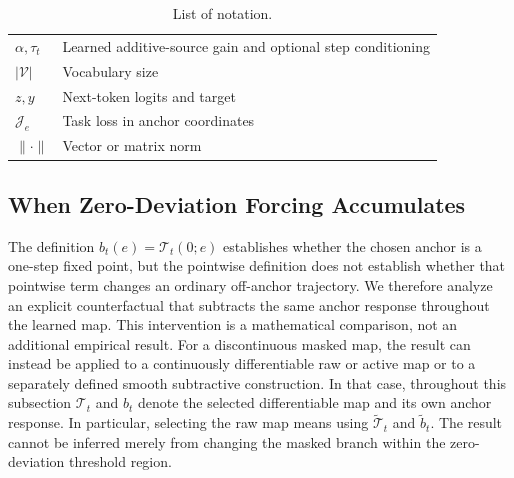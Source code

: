 \documentclass[letterpaper]{article} %
\newcommand{\norm}[1]{\lVert#1\rVert}
\newcommand{\Tmap}{\mathcal{T}}
\theoremstyle{remark}
\begin{document}
\begin{table}[t!]
{\begin{tabular}{ll}
			$\alpha,\tau_t$                         & Learned additive-source gain and optional step conditioning                       \\
			$|\mathcal V|$                          & Vocabulary size                                                                   \\
			$z,y$                                   & Next-token logits and target                                                      \\
			$\mathcal J_e$                          & Task loss in anchor coordinates                                                   \\
			$\norm{\cdot}$                          & Vector or matrix norm                                                             \\
			\bottomrule
		\end{tabular}
	}
	\caption{List of notation.}
	\label{tab:notation}
\end{table}

\subsection{When Zero-Deviation Forcing Accumulates}
\label{app:forcing-accumulation}
The definition $b_t(e)=\Tmap_t(0;e)$ establishes whether the chosen anchor is a one-step fixed point, but the pointwise definition does not establish whether that pointwise term changes an ordinary off-anchor trajectory.  We therefore analyze an explicit counterfactual that subtracts the same anchor response throughout the learned map.  This intervention is a mathematical comparison, not an additional empirical result.  For a discontinuous masked map, the result can instead be applied to a continuously differentiable raw or active map or to a separately defined smooth subtractive construction.  In that case, throughout this subsection $\Tmap_t$ and $b_t$ denote the selected differentiable map and its own anchor response.  In particular, selecting the raw map means using $\widetilde{\Tmap}_t$ and $\widetilde b_t$.  The result cannot be inferred merely from changing the masked branch within the zero-deviation threshold region.
\end{document}

